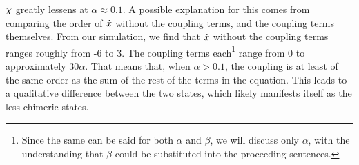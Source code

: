 $\chi$ greatly lessens at $\alpha \approx 0.1$.
A possible explanation for this comes from comparing the order of $\dot{x}$ without the coupling terms, and the coupling terms themselves.
From our simulation, we find that $\dot{x}$ without the coupling terms ranges roughly from -6 to 3.
The coupling terms each\footnote{Since the same can be said for both $\alpha$ and $\beta$, we will discuss only $\alpha$, with the understanding that $\beta$ could be substituted into the proceeding sentences.} range from 0 to approximately $30 \alpha$.
That means that, when $\alpha > 0.1$, the coupling is at least of the same order as the sum of the rest of the terms in the equation.
This leads to a qualitative difference between the two states, which likely manifests itself as the less chimeric states.

